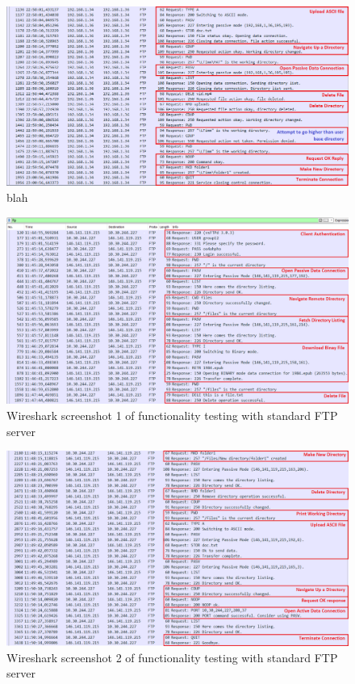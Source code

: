 \documentclass[10pt,twocolumn]{witseiepaper}
\begin{document}
\begin{appendix}
\begin{figure}[h]
	\centering
	\includegraphics[width=0.9\columnwidth]{ClientServer2anno.png}
	\caption{blah}
	\raggedright
	\label{fig:ourWS2}
\end{figure}

\begin{figure}[h]
	\centering
	\includegraphics[width=0.9\columnwidth]{WitsCaptureAnno2.png}
	\caption{Wireshark screenshot 1 of functionality testing with standard FTP server}
	\raggedright
	\label{fig:WitsWS1}
\end{figure}

\begin{figure}[h]
\centering
\includegraphics[width=0.9\columnwidth]{WitsServerCapture2.png}
\caption{Wireshark screenshot 2 of functionality testing with standard FTP server}
\raggedright
\label{fig:WitsWS2}
\end{figure}


\end{appendix}
\end{document}
